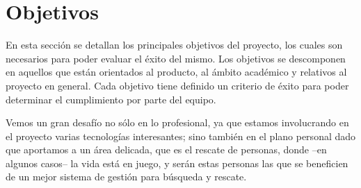 \section{Objetivos}\label{sec:objetivos}

En esta sección se detallan los principales objetivos del proyecto, los cuales son necesarios para poder evaluar el éxito del mismo. Los objetivos se descomponen en aquellos que están orientados al producto, al ámbito académico y relativos al proyecto en general. Cada objetivo tiene definido un criterio de éxito para poder determinar el cumplimiento por parte del equipo.

Vemos un gran desafío no sólo en lo profesional, ya que estamos involucrando en el proyecto varias tecnologías interesantes; sino también en el plano personal dado que aportamos a un área delicada, que es el rescate de personas, donde –en algunos casos– la vida está en juego, y serán estas personas las que se beneficien de un mejor sistema de gestión para búsqueda y rescate.
